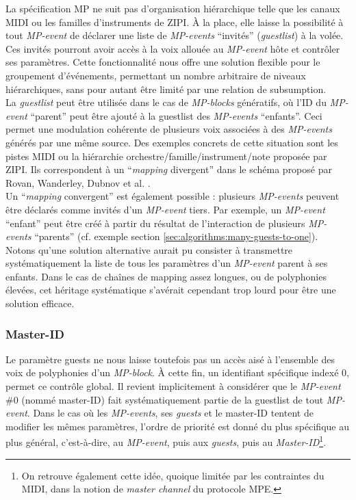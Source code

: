 \noindent La spécification MP ne suit pas d'organisation hiérarchique telle que les canaux \gls{MIDI} ou les familles d'instruments de \gls{ZIPI}. À la place, elle laisse la possibilité à tout \textit{MP-event} de déclarer une liste de \textit{MP-events} ``invités'' (\textit{guestlist}) à la volée. Ces invités pourront avoir accès à la voix allouée au \textit{MP-event} hôte et contrôler ses paramètres. Cette fonctionnalité nous offre une solution flexible pour le groupement d'événements, permettant un nombre arbitraire de niveaux hiérarchiques, sans pour autant être limité par une relation de subsumption.\\
\indent La \textit{guestlist} peut être utilisée dans le cas de \textit{MP-blocks} génératifs, où l'ID du \textit{MP-event} ``parent'' peut être ajouté à la guestlist des \textit{MP-events} ``enfants''. Ceci permet une modulation cohérente de plusieurs voix associées à des \textit{MP-events} générés par une même source. Des exemples concrets de cette situation sont les pistes \gls{MIDI} ou la hiérarchie orchestre/famille/instrument/note proposée par \gls{ZIPI}. Ils correspondent à un ``\textit{\gls{mapping}} divergent'' dans le schéma proposé par Rovan, Wanderley, Dubnov et al. \cite{rovan_instrumental_1997}.\\
\indent Un ``\textit{\gls{mapping}} convergent'' est également possible : plusieurs \textit{MP-events} peuvent être déclarés comme invités d'un \textit{MP-event} tiers. Par exemple, un \textit{MP-event} ``enfant'' peut être créé à partir du résultat de l'interaction de plusieurs \textit{MP-events} ``parents'' (cf. exemple section \ref{sec:algorithms:many-guests-to-one}).\\
\indent Notons qu'une solution alternative aurait pu consister à transmettre systématiquement la liste de tous les paramètres d'un \textit{MP-event} parent à ses enfants. Dans le cas de chaînes de mapping assez longues, ou de polyphonies élevées, cet héritage systématique s'avérait cependant trop lourd pour être une solution efficace.


\subsubsection{Master-ID}

\noindent Le paramètre guests ne nous laisse toutefois pas un accès aisé à l'ensemble des voix de polyphonies d'un \textit{MP-block}. À cette fin, un identifiant spécifique indexé 0, permet ce contrôle global. Il revient implicitement à considérer que le \textit{MP-event} \#0 (nommé master-ID) fait systématiquement partie de la guestlist de tout \textit{MP-event}. Dans le cas où les \textit{MP-events}, ses \textit{guests} et le master-ID tentent de modifier les mêmes paramètres, l'ordre de priorité est donné du plus spécifique au plus général, c'est-à-dire, au \textit{MP-event}, puis aux \textit{guests}, puis au \textit{Master-ID}\footnote{On retrouve également cette idée, quoique limitée par les contraintes du \gls{MIDI}, dans la notion de \textit{master channel} du protocole \gls{MPE}.}.

